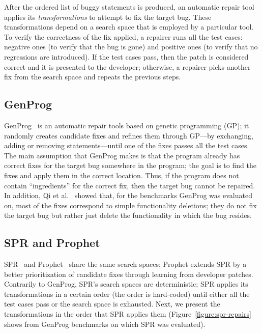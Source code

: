 After the ordered list of buggy statements is produced, an automatic repair tool applies its \emph{transformations} to attempt to fix the target bug. These transformations depend on a search space that is employed by a particular tool. To verify the correctness of the fix applied, a repairer runs all the test cases: negative ones (to verify that the bug is gone) and positive ones (to verify that no regressions are introduced). If the test cases pass, then the patch is considered correct and it is presented to the developer; otherwise, a repairer picks another fix from the search space and repeats the previous steps.

\subsection{GenProg}

GenProg~\cite{le2012systematic} is an automatic repair tools based on genetic programming (GP); it randomly creates candidate fixes and refines them through GP---by exchanging, adding or removing statements---until one of the fixes passes all the test cases. The main assumption that GenProg makes is that the program already has correct fixes for the target bug somewhere in the program; the goal is to find the fixes and apply them in the correct location. Thus, if the program does not contain ``ingredients'' for the correct fix, then the target bug cannot be repaired. In addition, Qi et al.~\cite{qi2015analysis} showed that, for the benchmarks GenProg was evaluated on, most of the fixes correspond to simple functionality deletions; they do not fix the target bug but rather just delete the functionality in which the bug resides.

\subsection{SPR and Prophet}

SPR~\cite{long2015staged} and Prophet~\cite{long2015prophet} share the same search spaces; Prophet extends SPR by a better prioritization of candidate fixes through learning from developer patches. Contrarily to GenProg, SPR's search spaces are deterministic; SPR applies its transformations in a certain order (the order is hard-coded) until either all the test cases pass or the search space is exhausted. Next, we present the transformations in the order that SPR applies them (Figure~\ref{figure:spr-repairs} shows from GenProg benchmarks on which SPR was evaluated).

